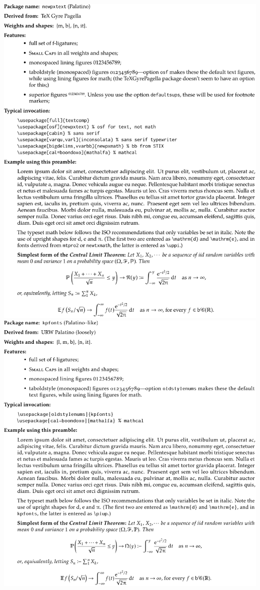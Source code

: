 \documentclass{article}
\begin{document}
\newpage
\hypertarget{lnk:newpx}{}
\includegraphics{zplsamp-crop}
\newpage
\hypertarget{lnk:kpfonts}{}
\includegraphics{kpsamp-crop}
\end{document}
